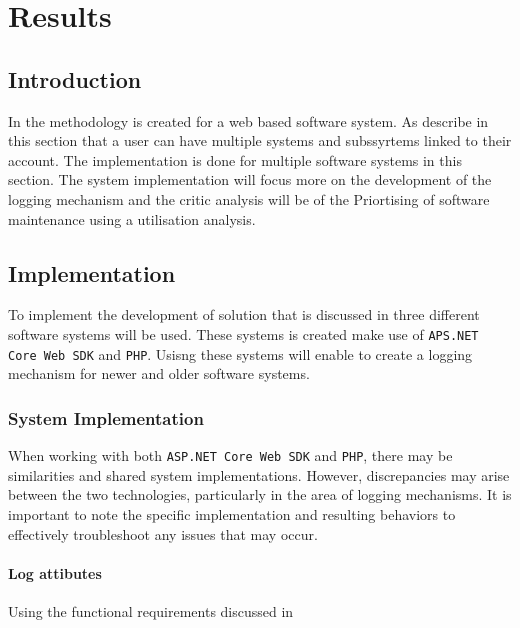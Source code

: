 \chapter{Results}
\label{chap:3}

\section{Introduction}
In  the methodology is created for a web based software system. As describe in this section that a user can have multiple systems and subssyrtems linked to their account. The implementation is done for multiple software systems in this section. The system implementation will focus more on the development of the logging mechanism and the critic analysis will be of the Priortising of software maintenance using a utilisation analysis.

\section{Implementation}
To implement the development of solution that is discussed in  three different software systems will be used. These systems is created make use of \texttt{APS.NET Core Web SDK} and \texttt{PHP}. Usisng these systems will enable to create a logging mechanism for newer and older software systems.

\subsection{System Implementation}
When working with both \texttt{ASP.NET Core Web SDK} and \texttt{PHP}, there may be similarities and shared system implementations. However, discrepancies may arise between the two technologies, particularly in the area of logging mechanisms. It is important to note the specific implementation and resulting behaviors to effectively troubleshoot any issues that may occur.

\subsubsection{Log attibutes}\label{sec:ch3_logAtrributes}
Using the functional requirements discussed in 

